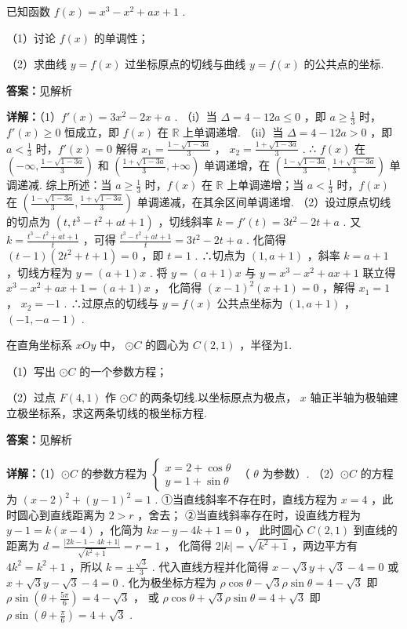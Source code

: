 \begin{question}[points=12]
已知函数 $f(x) = x^3 - x^2 + ax + 1$ .

（1）讨论 $f(x)$ 的单调性；

（2）求曲线 $y = f(x)$ 过坐标原点的切线与曲线 $y = f(x)$ 的公共点的坐标.
\begin{solution}
\textbf{答案：}见解析

\textbf{详解：}（1）$f'(x) = 3x^2 - 2x + a$ .
（i）当 $\Delta = 4 - 12a \le 0$ ，即 $a \ge \frac{1}{3}$ 时，$f'(x) \ge 0$ 恒成立，即 $f(x)$ 在 $\mathbb{R}$ 上单调递增.
（ii）当 $\Delta = 4 - 12a > 0$ ，即 $a < \frac{1}{3}$ 时，$f'(x)=0$ 解得 $x_1 = \frac{1-\sqrt{1-3a}}{3}$ ， $x_2 = \frac{1+\sqrt{1-3a}}{3}$ .
∴ $f(x)$ 在 $(-\infty, \frac{1-\sqrt{1-3a}}{3})$ 和 $(\frac{1+\sqrt{1-3a}}{3}, +\infty)$ 单调递增，在 $(\frac{1-\sqrt{1-3a}}{3}, \frac{1+\sqrt{1-3a}}{3})$ 单调递减.
综上所述：当 $a \ge \frac{1}{3}$ 时，$f(x)$ 在 $\mathbb{R}$ 上单调递增；当 $a < \frac{1}{3}$ 时，$f(x)$ 在 $(\frac{1-\sqrt{1-3a}}{3}, \frac{1+\sqrt{1-3a}}{3})$ 单调递减，在其余区间单调递增.
（2）设过原点切线的切点为 $(t, t^3 - t^2 + at + 1)$ ，切线斜率 $k = f'(t) = 3t^2 - 2t + a$ .
又 $k = \frac{t^3 - t^2 + at + 1}{t}$ ，可得 $\frac{t^3 - t^2 + at + 1}{t} = 3t^2 - 2t + a$ .
化简得 $(t-1)(2t^2 + t + 1) = 0$ ，即 $t = 1$ .
∴切点为 $(1, a+1)$ ，斜率 $k = a+1$ ，切线方程为 $y = (a+1)x$ .
将 $y = (a+1)x$ 与 $y = x^3 - x^2 + ax + 1$ 联立得 $x^3 - x^2 + ax + 1 = (a+1)x$ ，
化简得 $(x-1)^2(x+1) = 0$ ，解得 $x_1 = 1$ ， $x_2 = -1$ .
∴过原点的切线与 $y = f(x)$ 公共点坐标为 $(1, a+1)$ ， $(-1, -a-1)$ .
\end{solution}
\end{question}

\begin{question}[points=10]
在直角坐标系 $xOy$ 中， $\odot C$ 的圆心为 $C(2,1)$ ，半径为1.

（1）写出 $\odot C$ 的一个参数方程；

（2）过点 $F(4,1)$ 作 $\odot C$ 的两条切线.以坐标原点为极点， $x$ 轴正半轴为极轴建立极坐标系，求这两条切线的极坐标方程.
\begin{solution}
\textbf{答案：}见解析

\textbf{详解：}（1）$\odot C$ 的参数方程为 $\begin{cases} x = 2 + \cos\theta \\ y = 1 + \sin\theta \end{cases}$ （ $\theta$ 为参数）.
（2）$\odot C$ 的方程为 $(x-2)^2 + (y-1)^2 = 1$ .
①当直线斜率不存在时，直线方程为 $x=4$ ，此时圆心到直线距离为 $2 > r$ ，舍去；
②当直线斜率存在时，设直线方程为 $y-1 = k(x-4)$ ，化简为 $kx - y - 4k + 1 = 0$ ，
此时圆心 $C(2,1)$ 到直线的距离为 $d = \frac{|2k - 1 - 4k + 1|}{\sqrt{k^2+1}} = r = 1$ ，
化简得 $2|k| = \sqrt{k^2+1}$ ，两边平方有 $4k^2 = k^2 + 1$ ，所以 $k = \pm\frac{\sqrt{3}}{3}$ .
代入直线方程并化简得 $x - \sqrt{3}y + \sqrt{3} - 4 = 0$ 或 $x + \sqrt{3}y - \sqrt{3} - 4 = 0$ .
化为极坐标方程为 $\rho\cos\theta - \sqrt{3}\rho\sin\theta = 4 - \sqrt{3}$ 即 $\rho\sin(\theta + \frac{5\pi}{6}) = 4 - \sqrt{3}$ ，
或 $\rho\cos\theta + \sqrt{3}\rho\sin\theta = 4 + \sqrt{3}$ 即 $\rho\sin(\theta + \frac{\pi}{6}) = 4 + \sqrt{3}$ .
\end{solution}
\end{question}

